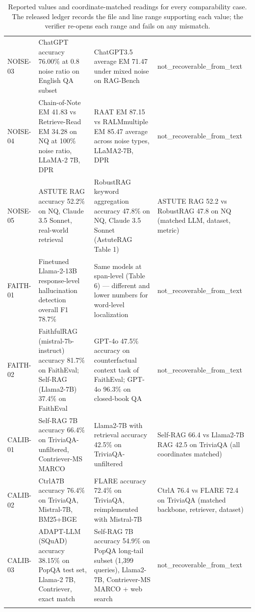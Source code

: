 \begin{table}[t]
\begin{tabular}{@{}p{}p{}p{}p{}@{}}
\addlinespace[1pt]
NOISE-03 & ChatGPT accuracy 76.00\% at 0.8 noise ratio on English QA subset & ChatGPT3.5 average EM 71.47 under mixed noise on RAG-Bench & not\_recoverable\_from\_text \\
\addlinespace[1pt]
NOISE-04 & Chain-of-Note EM 41.83 vs Retrieve-Read EM 34.28 on NQ at 100\% noise ratio, LLaMA-2 7B, DPR & RAAT EM 87.15 vs RALMmultiple EM 85.47 average across noise types, LLaMA2-7B, DPR & not\_recoverable\_from\_text \\
\addlinespace[1pt]
NOISE-05 & ASTUTE RAG accuracy 52.2\% on NQ, Claude 3.5 Sonnet, real-world retrieval & RobustRAG keyword aggregation accuracy 47.8\% on NQ, Claude 3.5 Sonnet (AstuteRAG Table 1) & ASTUTE RAG 52.2 vs RobustRAG 47.8 on NQ (matched LLM, dataset, metric) \\
\addlinespace[1pt]
FAITH-01 & Finetuned Llama-2-13B response-level hallucination detection overall F1 78.7\% & Same models at span-level (Table 6) — different and lower numbers for word-level localization & not\_recoverable\_from\_text \\
\addlinespace[1pt]
FAITH-02 & FaithfulRAG (mistral-7b-instruct) accuracy 81.7\% on FaithEval; Self-RAG (Llama2-7B) 37.4\% on FaithEval & GPT-4o 47.5\% accuracy on counterfactual context task of FaithEval; GPT-4o 96.3\% on closed-book QA & not\_recoverable\_from\_text \\
\addlinespace[1pt]
CALIB-01 & Self-RAG 7B accuracy 66.4\% on TriviaQA-unfiltered, Contriever-MS MARCO & Llama2-7B with retrieval accuracy 42.5\% on TriviaQA-unfiltered & Self-RAG 66.4 vs Llama2-7B RAG 42.5 on TriviaQA (all coordinates matched) \\
\addlinespace[1pt]
CALIB-02 & CtrlA7B accuracy 76.4\% on TriviaQA, Mistral-7B, BM25+BGE & FLARE accuracy 72.4\% on TriviaQA, reimplemented with Mistral-7B & CtrlA 76.4 vs FLARE 72.4 on TriviaQA (matched backbone, retriever, dataset) \\
\addlinespace[1pt]
CALIB-03 & ADAPT-LLM (SQuAD) accuracy 38.15\% on PopQA test set, Llama-2 7B, Contriever, exact match & Self-RAG 7B accuracy 54.9\% on PopQA long-tail subset (1,399 queries), Llama2-7B, Contriever-MS MARCO + web search & not\_recoverable\_from\_text \\
\addlinespace[1pt]
\bottomrule
\end{tabular}
\caption{Reported values and coordinate-matched readings for every comparability case. The released ledger records the file and line range supporting each value; the verifier re-opens each range and fails on any mismatch.}
\label{tab:cross-paper-cases-full}
\end{table}
